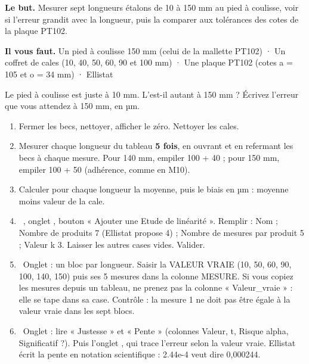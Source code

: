 \documentclass[10pt,a4paper]{article}
\begin{document}
\thispagestyle{fancy}
\begin{tcolorbox}[boite]\textbf{Le but.} Mesurer sept longueurs étalons de 10 à 150 mm au pied à coulisse, voir si l'erreur grandit avec la longueur, puis la comparer aux tolérances des cotes de la plaque PT102.\par\textbf{Il vous faut.} Un pied à coulisse 150 mm (celui de la mallette PT102) · Un coffret de cales (10, 40, 50, 60, 90 et 100 mm) · Une plaque PT102 (cotes a = 105 et o = 34 mm) · Ellistat\end{tcolorbox}
\begin{tcolorbox}[pred]Le pied à coulisse est juste à 10 mm. L'est-il autant à 150 mm ? Écrivez l'erreur que vous attendez à 150 mm, en µm.\reponse\end{tcolorbox}
\begin{enumerate}[label=\textcolor{cyan}{\textbf{\arabic*.}},leftmargin=15pt,itemsep=1.5pt]
\item Fermer les becs, nettoyer, afficher le zéro. Nettoyer les cales.
\item Mesurer chaque longueur du tableau \textbf{5 fois}, en ouvrant et en refermant les becs à chaque mesure. Pour 140 mm, empiler 100 + 40 ; pour 150 mm, empiler 100 + 50 (adhérence, comme en M10).
\item Calculer pour chaque longueur la moyenne, puis le biais en µm : moyenne moins valeur de la cale.
\item \tagE\ , onglet , bouton « Ajouter une Etude de linéarité ». Remplir : Nom ; Nombre de produits 7 (Ellistat propose 4) ; Nombre de mesures par produit 5 ; Valeur k 3. Laisser les autres cases vides. Valider.
\item \tagE\ Onglet  : un bloc par longueur. Saisir la VALEUR VRAIE (10, 50, 60, 90, 100, 140, 150) puis ses 5 mesures dans la colonne MESURE. Si vous copiez les mesures depuis un tableau, ne prenez pas la colonne « Valeur\_vraie » : elle se tape dans sa case. Contrôle : la mesure 1 ne doit pas être égale à la valeur vraie dans les sept blocs.
\item \tagE\ Onglet  : lire « Justesse » et « Pente » (colonnes Valeur, t, Risque alpha, Significatif ?). Puis l'onglet , qui trace l'erreur selon la valeur vraie. Ellistat écrit la pente en notation scientifique : 2.44e-4 veut dire 0,000244.
\end{enumerate}
\end{document}

